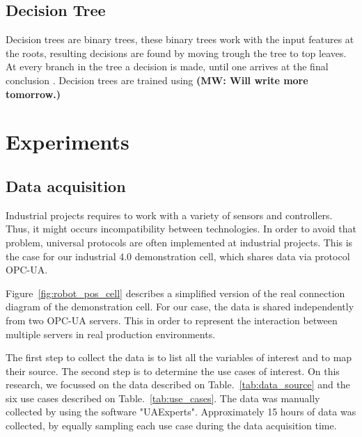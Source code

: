 \documentclass[5p,times,procedia]{elsarticle}
\newcommand{\MW}[1]{{\color{teal} {\bf (MW: #1)}}}
\begin{document}
\subsection{Decision Tree}
Decision trees are binary trees, these binary trees work with the input
features at the roots, resulting decisions are found by moving
trough the tree to top leaves. At every branch in the tree a decision
is made, until one arrives at the final conclusion \cite{Marsland2015Machine}.
Decision trees are trained using  
\MW{Will write more tomorrow.}


\section{Experiments}

\subsection{Data acquisition}

Industrial projects requires to work with a variety of sensors and controllers. Thus, it might occurs incompatibility between technologies. In order to avoid that problem, universal protocols are often implemented at industrial projects. This is the case for our industrial 4.0 demonstration cell, which shares data via protocol OPC-UA. 

Figure~\ref{fig:robot_pos_cell} describes a simplified version of the real connection diagram of the demonstration cell. For our case, the data is shared independently from two OPC-UA servers. This in order to represent the interaction between multiple servers in real production environments. 

The first step to collect the data is to list all the variables of interest and to map their source. The second step is to determine the use cases of interest.  On this research, we focussed on the data described on Table.~\ref{tab:data_source} and the six use cases described on Table.~\ref{tab:use_cases}. The data was manually collected by using the software "UAExperts". Approximately 15 hours of data was collected, by equally sampling each use case during the data acquisition time.
\end{document}
